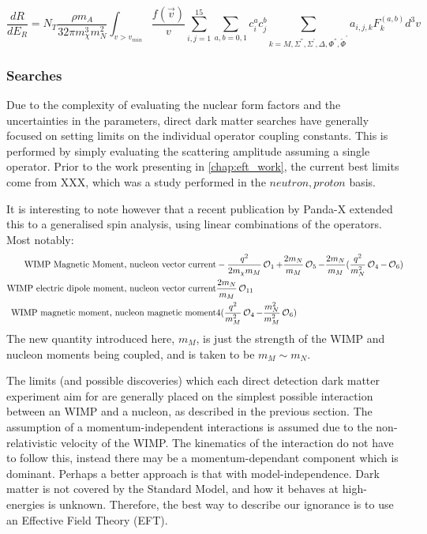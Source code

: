 \begin{equation}
    \frac{dR}{dE_R} = N_T \frac{\rho m_A}{32 \pi m_\chi^3 m_N^2} \int_{v>v_{min}} \frac{f(\vec{v})}{v} \sum_{i,j=1}^{15} \sum_{a,b=0,1} c_i^a c_j^b \sum_{k=M,\Sigma^{''},\Sigma^{'},\Delta, \Phi^{''},\tilde{\Phi}^{'}} a_{i,j,k}F_{k}^{(a,b)} d^3 v
    \label{eq:final_eft_differential_cross_section}
\end{equation}

\subsubsection{Searches}
\par
Due to the complexity of evaluating the nuclear form factors and the uncertainties in the parameters, direct dark matter searches have generally focused on setting limits on the individual operator coupling constants.
This is performed by simply evaluating the scattering amplitude assuming a single operator.
Prior to the work presenting in \autoref{chap:eft_work}, the current best limits come from XXX, which was a study performed in the {$neutron,proton$} basis.

\par
It is interesting to note however that a recent publication by Panda-X extended this to a generalised spin analysis, using linear combinations of the operators.
Most notably:
\begin{equation}
\begin{split}
    \text{WIMP Magnetic Moment, nucleon vector current} & -\frac{q^2}{2m_\chi m_M}\operatorname{\mathcal{O}}_1 + \frac{2m_N}{m_M}\operatorname{\mathcal{O}}_5 - \frac{2m_N}{m_M}(\frac{q^2}{m_N^2}\operatorname{\mathcal{O}}_4 - \operatorname{\mathcal{O}}_6) \\
    \text{WIMP electric dipole moment, nucleon vector current} & \frac{2m_N}{m_M}\operatorname{\mathcal{O}}_{11} \\
    \text{WIMP magnetic moment, nucleon magnetic moment} & 4(\frac{q^2}{m_M^2}\operatorname{\mathcal{O}}_4 - \frac{m_N^2}{m_M^2}\operatorname{\mathcal{O}}_6)
\end{split}
\end{equation}
The new quantity introduced here, $m_M$, is just the strength of the WIMP and nucleon moments being coupled, and is taken to be $m_M \sim m_N$.


\iffalse
\par
The limits (and possible discoveries) which each direct detection dark matter experiment aim for are generally placed on the simplest possible interaction between an WIMP and a nucleon, as described in the previous section.
The assumption of a momentum-independent interactions is assumed due to the non-relativistic velocity of the WIMP.
The kinematics of the interaction do not have to follow this, instead there may be a momentum-dependant component which is dominant.
Perhaps a better approach is that with model-independence.
Dark matter is not covered by the Standard Model, and how it behaves at high-energies is unknown.
Therefore, the best way to describe our ignorance is to use an Effective Field Theory (EFT).

